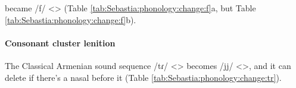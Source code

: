 became /f/ <> (Table \ref{tab:Sebastia:phonology:change:f}a, but Table \ref{tab:Sebastia:phonology:change:f}b). 



\begin{table}[H]
	\centering 
	\caption{Change from Classical Armenian /h/ <> to /f/ <> in the Sebastia dialect}
	\label{tab:Sebastia:phonology:change:f}
\end{table}

\paragraph{Consonant cluster lenition}

The Classical Armenian sound sequence /tɾ/ <> becomes /jj/ <>, and it can delete if there's a nasal before it (Table \ref{tab:Sebastia:phonology:change:tr}). 



